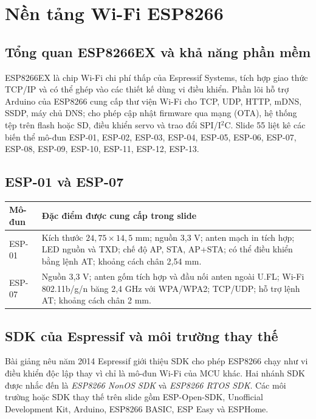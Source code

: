\section{Nền tảng Wi-Fi ESP8266}
\subsection{Tổng quan ESP8266EX và khả năng phần mềm}
ESP8266EX là chip Wi-Fi chi phí thấp của Espressif Systems, tích hợp giao thức TCP/IP và có thể ghép vào các thiết kế dùng vi điều khiển. Phần lõi hỗ trợ Arduino của ESP8266 cung cấp thư viện Wi-Fi cho TCP, UDP, HTTP, mDNS, SSDP, máy chủ DNS; cho phép cập nhật firmware qua mạng (OTA), hệ thống tệp trên flash hoặc SD, điều khiển servo và trao đổi SPI/I\(^{2}\)C. Slide 55 liệt kê các biến thể mô-đun ESP-01, ESP-02, ESP-03, ESP-04, ESP-05, ESP-06, ESP-07, ESP-08, ESP-09, ESP-10, ESP-11, ESP-12, ESP-13.
\subsection{ESP-01 và ESP-07}
\begin{longtable}{p{.34\linewidth}p{.57\linewidth}}\toprule\textbf{Mô-đun} & \textbf{Đặc điểm được cung cấp trong slide}\\\midrule\endhead
ESP-01 & Kích thước $24{,}75\times14{,}5$ mm; nguồn 3,3 V; anten mạch in tích hợp; LED nguồn và TXD; chế độ AP, STA, AP+STA; có thể điều khiển bằng lệnh AT; khoảng cách chân 2,54 mm.\\
ESP-07 & Nguồn 3,3 V; anten gốm tích hợp và đầu nối anten ngoài U.FL; Wi-Fi 802.11b/g/n băng 2,4 GHz với WPA/WPA2; TCP/UDP; hỗ trợ lệnh AT; khoảng cách chân 2 mm.\\\bottomrule\end{longtable}
\subsection{SDK của Espressif và môi trường thay thế}
Bài giảng nêu năm 2014 Espressif giới thiệu SDK cho phép ESP8266 chạy như vi điều khiển độc lập thay vì chỉ là mô-đun Wi-Fi của MCU khác. Hai nhánh SDK được nhắc đến là \emph{ESP8266 NonOS SDK} và \emph{ESP8266 RTOS SDK}. Các môi trường hoặc SDK thay thế trên slide gồm ESP-Open-SDK, Unofficial Development Kit, Arduino, ESP8266 BASIC, ESP Easy và ESPHome.
